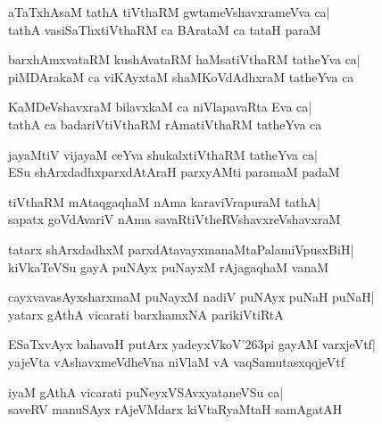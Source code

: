 \documentclass[twoside,12pt,openright]{book}
\def\S{\char'263}
\newcounter{shloka}[chapter]
\begin{document}
\begin{shloka}%
aTaTxhAsaM tathA tiVthaRM gwtameVshavxrameVva ca|\\
tathA vasiSaThxtiVthaRM ca BArataM ca tataH paraM
\end{shloka}

\begin{shloka}%
barxhAmxvataRM kushAvataRM haMsatiVthaRM tatheYva ca|\\
piMDArakaM ca viKAyxtaM shaMKoVdAdhxraM tatheYva ca
\end{shloka}

\begin{shloka}%
KaMDeVshavxraM bilavxkaM ca niVlapavaRta Eva ca|\\
tathA ca badariVtiVthaRM rAmatiVthaRM tatheYva ca 
\end{shloka}

\begin{shloka}%
jayaMtiV vijayaM ceYva shukalxtiVthaRM tatheYva ca|\\
ESu shArxdadhxparxdAtAraH parxyAMti paramaM padaM
\end{shloka}

\begin{shloka}%
tiVthaRM mAtaqgaqhaM nAma karaviVrapuraM tathA|\\
sapatx goVdAvariV nAma savaRtiVtheRVshavxreVshavxraM 
\end{shloka}

\begin{shloka}%
tatarx shArxdadhxM parxdAtavayxmanaMtaPalamiVpusxBiH|\\
kiVkaTeVSu gayA puNAyx puNayxM rAjagaqhaM vanaM
\end{shloka}

\begin{shloka}%
cayxvavasAyxsharxmaM puNayxM nadiV puNAyx puNaH puNaH|\\
yatarx gAthA vicarati barxhamxNA parikiVtiRtA
\end{shloka}

\begin{shloka}%
ESaTxvAyx bahavaH putArx yadeyxVkoV\S pi gayAM varxjeVtf|\\
yajeVta vAshavxmeVdheVna niVlaM vA vaqSamutasxqqjeVtf
\end{shloka}

\begin{shloka}%
iyaM gAthA vicarati puNeyxVSAvxyataneVSu ca|\\
saveRV manuSAyx rAjeVMdarx kiVtaRyaMtaH samAgatAH
\end{shloka}
\end{document}
